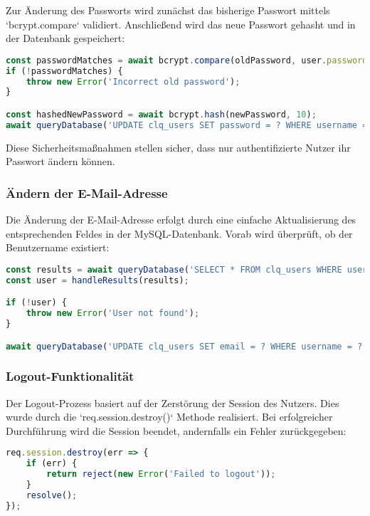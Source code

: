 Zur Änderung des Passworts wird zunächst das bisherige Passwort mittels `bcrypt.compare` validiert.
Anschließend wird das neue Passwort gehasht und in der Datenbank gespeichert:

\begin{lstlisting}[language=JavaScript, caption=Passwortvalidierung und Update]
const passwordMatches = await bcrypt.compare(oldPassword, user.password);
if (!passwordMatches) {
    throw new Error('Incorrect old password');
}

const hashedNewPassword = await bcrypt.hash(newPassword, 10);
await queryDatabase('UPDATE clq_users SET password = ? WHERE username = ?', [hashedNewPassword, username]);
\end{lstlisting}

Diese Sicherheitsmaßnahmen stellen sicher, dass nur authentifizierte Nutzer ihr Passwort ändern können.

\subsubsection{Ändern der E-Mail-Adresse}\label{subsubsec:email-update}

Die Änderung der E-Mail-Adresse erfolgt durch eine einfache Aktualisierung des entsprechenden Feldes in der MySQL-Datenbank.
Vorab wird überprüft, ob der Benutzername existiert:

\begin{lstlisting}[language=JavaScript, caption=Update der E-Mail-Adresse]
const results = await queryDatabase('SELECT * FROM clq_users WHERE username = ?', [username]);
const user = handleResults(results);

if (!user) {
    throw new Error('User not found');
}

await queryDatabase('UPDATE clq_users SET email = ? WHERE username = ?', [newEmail, username]);
\end{lstlisting}

\subsubsection{Logout-Funktionalität}\label{subsubsec:logout}

Der Logout-Prozess basiert auf der Zerstörung der Session des Nutzers.
Dies wurde durch die `req.session.destroy()` Methode realisiert.
Bei erfolgreicher Durchführung wird die Session beendet, andernfalls ein Fehler zurückgegeben:

\begin{lstlisting}[language=JavaScript, caption=Logout-Service über Session-Zerstörung]
req.session.destroy(err => {
    if (err) {
        return reject(new Error('Failed to logout'));
    }
    resolve();
});
\end{lstlisting}